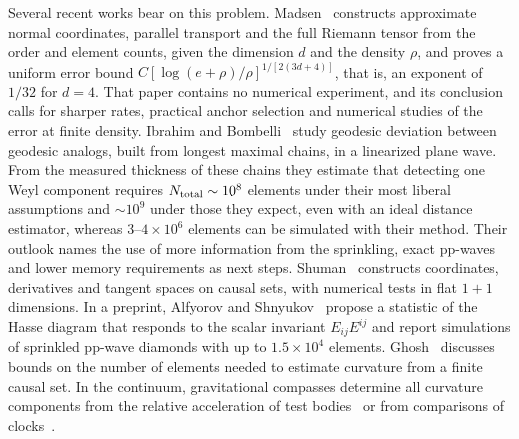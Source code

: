\documentclass[11pt,a4paper]{article}
\newcommand{\IB}{Ibrahim and Bombelli}
\begin{document}
Several recent works bear on this problem. Madsen~\cite{madsen} constructs
approximate normal coordinates, parallel transport and the full Riemann
tensor from the order and element counts, given the dimension $d$ and the
density $\rho$, and proves a uniform error bound
$C[\log(e+\rho)/\rho]^{1/[2(3d+4)]}$, that is, an exponent of $1/32$ for
$d=4$. That paper contains no numerical experiment, and its conclusion calls
for sharper rates, practical anchor selection and numerical studies of the
error at finite density. \IB~\cite{ib} study geodesic deviation between
geodesic analogs, built from longest maximal chains, in a linearized plane
wave. From the measured thickness of these chains they estimate that
detecting one Weyl component requires $N_{\rm total}\sim10^8$ elements under
their most liberal assumptions and $\sim10^9$ under those they expect, even
with an ideal distance estimator, whereas $3$--$4\times10^6$ elements can be
simulated with their method. Their outlook names the use of more information
from the sprinkling, exact pp-waves and lower memory requirements as next
steps. Shuman~\cite{shumana,shumanb} constructs coordinates, derivatives and
tangent spaces on causal sets, with numerical tests in flat $1+1$
dimensions. In a preprint, Alfyorov and Shnyukov~\cite{alfyorov} propose a
statistic of the Hasse diagram that responds to the scalar invariant
$E_{ij}E^{ij}$ and report simulations of sprinkled pp-wave diamonds with up
to $1.5\times10^4$ elements. Ghosh~\cite{ghosh} discusses bounds on the
number of elements needed to estimate curvature from a finite causal set. In
the continuum, gravitational compasses determine all curvature components
from the relative acceleration of test bodies~\cite{szekeres} or from
comparisons of clocks~\cite{puetzfeld}.
\end{document}
